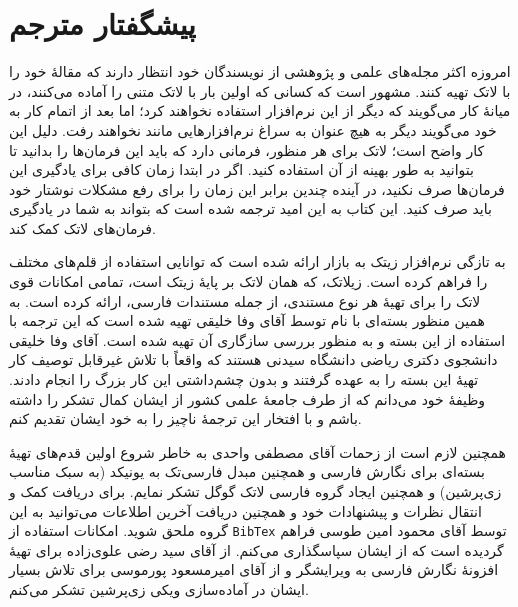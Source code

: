 \chapter{پیشگفتار مترجم}
امروزه اکثر مجله‌های علمی و پژوهشی از نویسندگان خود انتظار دارند که مقالهٔ خود را با لاتک تهیه کنند. مشهور است که کسانی که اولین بار با لاتک متنی را آماده می‌کنند، در میانهٔ کار می‌گویند که دیگر از این نرم‌افزار استفاده نخواهند کرد؛ اما بعد از اتمام کار به خود می‌گویند دیگر به هیچ عنوان به سراغ نرم‌افزارهایی مانند  نخواهند رفت. دلیل این کار واضح است؛ لاتک برای هر منظور، فرمانی دارد که باید این فرمان‌ها را بدانید تا بتوانید به طور بهینه از آن استفاده کنید. اگر در ابتدا زمان کافی برای یادگیری این فرمان‌ها صرف نکنید، در آینده چندین برابر این زمان را برای رفع مشکلات نوشتار خود باید صرف کنید. این کتاب به این امید ترجمه شده است که بتواند به شما در یادگیری فرمان‌های لاتک کمک کند.

به تازگی نرم‌افزار زیتک به بازار ارائه شده است که توانایی استفاده از قلم‌های مختلف را فراهم کرده است. زیلاتک، که همان لاتک بر پایهٔ زیتک است، تمامی امکانات قوی لاتک را برای تهیهٔ هر نوع مستندی، از جمله مستندات فارسی، ارائه کرده است. به همین منظور بسته‌ای با نام \lr{\XePersian} توسط آقای وفا خلیقی تهیه شده است که این ترجمه با استفاده از این بسته و به منظور بررسی سازگاری آن تهیه شده است. آقای وفا خلیقی دانشجوی دکتری ریاضی دانشگاه سیدنی هستند که واقعاً با تلاش غیرقابل توصیف کار تهیهٔ این بسته را به عهده گرفتند و بدون چشم‌داشتی این کار بزرگ را انجام دادند. وظیفهٔ خود می‌دانم که از طرف جامعهٔ علمی کشور از ایشان کمال تشکر را داشته باشم و با افتخار این ترجمهٔ ناچیز را به خود ایشان تقدیم کنم. 

همچنین لازم است از زحمات آقای مصطفی واحدی به خاطر شروع اولین قدم‌های تهیهٔ بسته‌ای برای نگارش فارسی و همچنین مبدل فارسی‌تک به یونیکد (به سبک مناسب زی‌پرشین) و همچنین ایجاد گروه فارسی لاتک گوگل%
تشکر نمایم.  برای دریافت کمک و انتقال نظرات و پیشنهادات خود و همچنین دریافت آخرین اطلاعات می‌توانید به این گروه ملحق شوید. امکانات استفاده از \texttt{BibTex} توسط آقای محمود امین طوسی فراهم گردیده است که از ایشان سپاسگذاری می‌کنم. از آقای سید رضی علوی‌زاده برای تهیهٔ افزونهٔ نگارش فارسی به ویرایشگر  و از آقای امیرمسعود پورموسی برای تلاش بسیار ایشان در آماده‌سازی ویکی زی‌پرشین%
تشکر می‌کنم.
\begin{latin}
\end{latin}